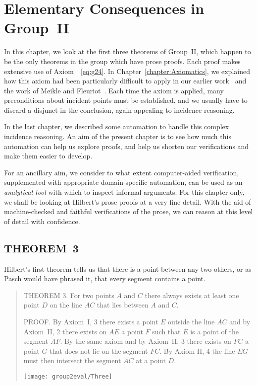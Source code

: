 \chapter{Elementary Consequences in Group~II}\label{chapter:Group2Eval}
In this chapter, we look at the first three theorems of Group~II, which happen to be the only theorems in the group which have prose proofs. Each proof makes extensive use of Axiom~~\ref{eq:g24}. In Chapter~\ref{chapter:Axiomatics}, we explained how this axiom had been particularly difficult to apply in our earlier work~\cite{ScottMScThesis} and the work of Meikle and Fleuriot~\cite{MeikleFleuriotFormalizingHilbert}. Each time the axiom is applied, many preconditions about incident points must be established, and we usually have to discard a disjunct in the conclusion, again appealing to incidence reasoning. 

In the last chapter, we described some automation to handle this complex incidence reasoning. An aim of the present chapter is to see how much this automation can help us explore proofs, and help us shorten our verifications and make them easier to develop. 

For an ancillary aim, we consider to what extent computer-aided verification, supplemented with appropriate domain-specific automation, can be used as an \emph{analytical tool} with which to inspect informal arguments. For this chapter only, we shall be looking at Hilbert's prose proofs at a very fine detail. With the aid of machine-checked and faithful verifications of the prose, we can reason at this level of detail with confidence.

\section{THEOREM~3}\label{sec:Theorem3}
Hilbert's first theorem tells us that there is a point between any two others, or as Pasch would have phrased it, that every segment contains a point.

\begin{quotation}
THEOREM 3. For two points $A$ and $C$ there always exists at least one point $D$ on the line $AC$ that lies between $A$ and $C$.

PROOF. By Axiom~I, 3 there exists a point $E$ outside the line $AC$ and by Axiom~II, 2 there exists on $AE$ a point $F$ such that $E$ is a point of the segment $AF$. By the same axiom and by Axiom~II, 3 there exists on $FC$ a point $G$ that does not lie on the segment $FC$. By Axiom II, 4 the line $EG$ must then intersect the segment $AC$ at a point $D$.

\centering\texttt{[image: group2eval/Three]}
\end{quotation}

